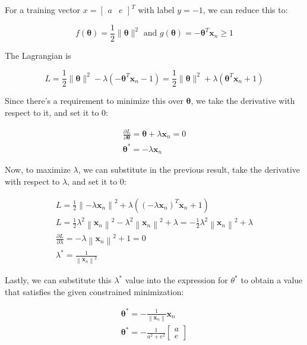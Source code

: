 \documentclass[11pt]{article}
\begin{document}
For a training vector $x=\left[\begin{array}{ll}a & e\end{array}\right]^{T}$ with label $y=-1$, we can reduce this to:

$$
f(\boldsymbol{\theta})=\frac{1}{2}\|\boldsymbol{\theta}\|^{2} \text { and } g(\boldsymbol{\theta})=-\boldsymbol{\theta}^{T} \mathbf{x}_{n} \geq 1
$$

The Lagrangian is

$$
L=\frac{1}{2}\|\boldsymbol{\theta}\|^{2}-\lambda\left(-\boldsymbol{\theta}^{T} \mathbf{x}_{n}-1\right)=\frac{1}{2}\|\boldsymbol{\theta}\|^{2}+\lambda\left(\boldsymbol{\theta}^{T} \mathbf{x}_{n}+1\right)
$$

Since there's a requirement to minimize this over $\boldsymbol{\theta}$, we take the derivative with respect to it, and set it to 0:

$$
\begin{gathered}
\frac{\partial L}{\partial \boldsymbol{\theta}}=\boldsymbol{\theta}+\lambda \mathbf{x}_{n}=0 \\
\boldsymbol{\theta}^{*}=-\lambda \mathbf{x}_{n}
\end{gathered}
$$

Now, to maximize $\lambda$, we can substitute in the previous result, take the derivative with respect to $\lambda$, and set it to 0:

$$
\begin{gathered}
L=\frac{1}{2}\left\|-\lambda \mathbf{x}_{n}\right\|^{2}+\lambda\left(\left(-\lambda \mathbf{x}_{n}\right)^{T} \mathbf{x}_{n}+1\right) \\
L=\frac{1}{2} \lambda^{2}\left\|\mathbf{x}_{n}\right\|^{2}-\lambda^{2}\left\|\mathbf{x}_{n}\right\|^{2}+\lambda=-\frac{1}{2} \lambda^{2}\left\|\mathbf{x}_{n}\right\|^{2}+\lambda \\
\frac{\partial L}{\partial \lambda}=-\lambda\left\|\mathbf{x}_{n}\right\|^{2}+1=0 \\
\lambda^{*}=\frac{1}{\left\|\mathbf{x}_{n}\right\|^{2}}
\end{gathered}
$$

Lastly, we can substitute this $\lambda^{*}$ value into the expression for $\theta^{*}$ to obtain a value that satisfies the given constrained minimization:

$$
\begin{gathered}
\boldsymbol{\theta}^{*}=-\frac{1}{\left\|\mathbf{x}_{n}\right\|} \mathbf{x}_{n} \\
\boldsymbol{\theta}^{*}=-\frac{1}{a^{2}+e^{2}}\left[\begin{array}{l}
a \\
e
\end{array}\right]
\end{gathered}
$$
\end{document}
